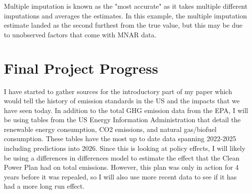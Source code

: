 \documentclass{article}
\begin{document}
Multiple imputation is known as the "most accurate" as it takes multiple different imputations and averages the estimates. In this example, the multiple imputation estimate landed as the second furthest from the true value, but this may be due to unobserved factors that come with MNAR data.

\section{Final Project Progress}

I have started to gather sources for the introductory part of my paper which would tell the history of emission standards in the US and the impacts that we have seen today. In addition to the total GHG emission data from the EPA, I will be using tables from the US Energy Information Administration that detail the renewable energy consumption, CO2 emissions, and natural gas/biofuel consumption. These tables have the most up to date data spanning 2022-2025 including predictions into 2026. Since this is looking at policy effects, I will likely be using a differences in differences model to estimate the effect that the Clean Power Plan had on total emissions. However, this plan was only in action for 4 years before it was repealed, so I will also use more recent data to see if it has had a more long run effect. 
\end{document}
